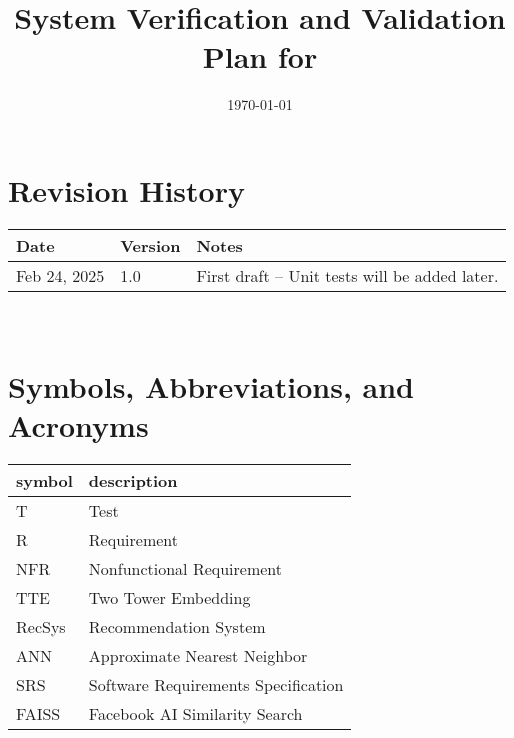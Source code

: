 \documentclass[12pt, titlepage]{article}
\begin{document}
\title{System Verification and Validation Plan for \progname{}} 
\author{\authname}
\date{\today}
	
\maketitle


\section*{Revision History}

\begin{tabularx}{\textwidth}{p{3cm}p{2cm}X}
\toprule {\bf Date} & {\bf Version} & {\bf Notes}\\
\midrule
Feb 24, 2025 & 1.0 & First draft – Unit tests will be added later.\\
\bottomrule
\end{tabularx}

~\\

\newpage

\tableofcontents

\listoftables

\newpage

\section{Symbols, Abbreviations, and Acronyms}

\renewcommand{\arraystretch}{1.2}
\begin{tabular}{l l} 
  \toprule		
  \textbf{symbol} & \textbf{description}\\
  \midrule 
  T & Test\\
  R & Requirement\\
  NFR & Nonfunctional Requirement\\
  TTE & Two Tower Embedding\\
  RecSys & Recommendation System\\
  ANN & Approximate Nearest Neighbor\\
  SRS & Software Requirements Specification\\
  FAISS & Facebook AI Similarity Search\\
  \bottomrule
\end{tabular}\\

\newpage

\end{document}

